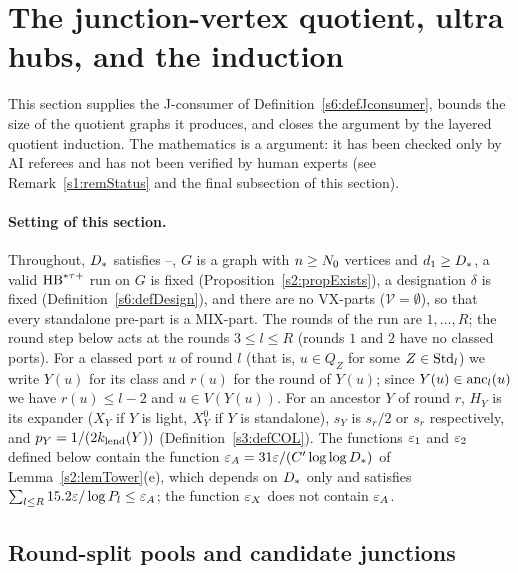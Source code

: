 \section{The junction-vertex quotient, ultra hubs, and the induction}\label{s7:sec}

This section supplies the J-consumer of Definition~\ref{s6:defJconsumer}, bounds
the size of the quotient graphs it produces, and closes the argument by the
layered quotient induction. The mathematics is a \candidate{} argument: it has
been checked only by AI referees and has not been verified by human experts (see
Remark~\ref{s1:remStatus} and the final subsection of this section).

\paragraph{Setting of this section.}
Throughout, $D_{*}$ satisfies --, $G$ is a graph with $n\ge N_{0}$
vertices and $d_1\ge D_{*}$, a valid $\mathrm{HB}^{*\tau{+}}$ run on $G$ is fixed
(Proposition~\ref{s2:propExists}), a designation $\delta$ is fixed
(Definition~\ref{s6:defDesign}), and there are no VX-parts
($\mathcal{V}=\emptyset$), so that every standalone pre-part is a MIX-part. The
rounds of the run are $1,\dots,R$; the round step below acts at the rounds
$3\le l\le R$ (rounds $1$ and $2$ have no classed ports). For a classed port $u$
of round $l$ (that is, $u\in Q_Z$ for some $Z\in\mathrm{Std}_l$) we write $Y(u)$ for its
class and $r(u)$ for the round of $Y(u)$; since $Y(u)\in\mathrm{anc}_l(u)$ we have
$r(u)\le l-2$ and $u\in V(Y(u))$. For an ancestor $Y$ of round $r$, $H_Y$ is its
expander ($X_Y$ if $Y$ is light, $X^0_Y$ if $Y$ is standalone), $s_Y$ is $s_r/2$
or $s_r$ respectively, and $p_Y=1/(2k_{\mathrm{lend}}(Y))$ (Definition~\ref{s3:defCOL}).
The functions $\varepsilon_{1}$ and $\varepsilon_{2}$ defined below contain the function
$\varepsilon_{A}=31\varepsilon/(C'\log\log D_{*})$ of Lemma~\ref{s2:lemTower}(e), which depends
on $D_{*}$ only and satisfies $\sum_{l\le R}15.2\varepsilon/\log P_l\le\varepsilon_{A}$; the
function $\varepsilon_{X}$ does not contain $\varepsilon_{A}$.

\subsection{Round-split pools and candidate junctions}

